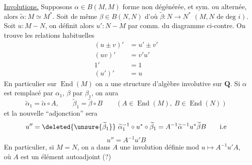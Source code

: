 \uline{Involutions.} Supposons $\alpha\in B(M,M)$ forme   non dégénérée, et sym. ou  alternée, alors   $\widetilde\alpha:M\simeq M^{*}$. Soit de même $\beta\in B(N,N)$ d'où $\widetilde\beta:N\longrightarrow N^{*}$ $(M,N\text{ de deg }i)$.
Soit $u:M\mathbin{-}N$, on définit alors $u':N\mathbin{-}M$ par comm. du diagramme ci-contre.
On trouve les relations habituelles
\[
\begin{aligned}
(u\pm v)'&=u'\pm v'\\
(uv)'&=v'u'\\
1'&=1\\
(u')'&=u
\end{aligned}
\]
En particulier sur $\operatorname{End}(M)$ on a une structure d'algèbre involutive sur $\mathbf Q$. 
Si $\alpha$ est remplacé par $\alpha_1$, $\beta$ par $\beta_1$, on aura
\[
\widetilde\alpha_1=\widetilde\alpha\circ A,\qquad\widetilde\beta_1=\widetilde\beta\circ B\qquad(A\in\operatorname{End}(M),\ B\in\operatorname{End}(N))
\]
et la nouvelle ``adjonction'' sera
\[
u''=\deleted{\unsure{\widetilde\beta_1}}\ \widetilde\alpha_1^{-1}\circ u^{*}\circ\widetilde\beta_1
=A^{-1}\widetilde\alpha^{-1}u^{*}\widetilde\beta B\qquad\text{i.e}
\]
\[
u''=A^{-1}u'B
\]
En particulier, si $M=N$, on a dans $A$ une involution définie mod  $u\mapsto A^{-1}u'A$, où $A$ est un élément autoadjoint (?)
